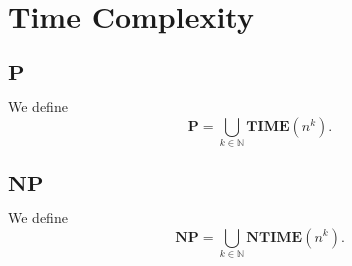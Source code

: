 \chapter{Time Complexity}
\section{$\mathbf{P}$}
\begin{definition}
  We define
  \begin{equation*}
    \mathbf{P} = \bigcup_{k \in \mathbb{N}} \mathbf{TIME}(n^k).
  \end{equation*}
\end{definition}

\section{$\mathbf{NP}$}
\begin{definition}
  We define
  \begin{equation*}
    \mathbf{NP} = \bigcup_{k \in \mathbb{N}} \mathbf{NTIME}(n^k).
  \end{equation*}
\end{definition}
